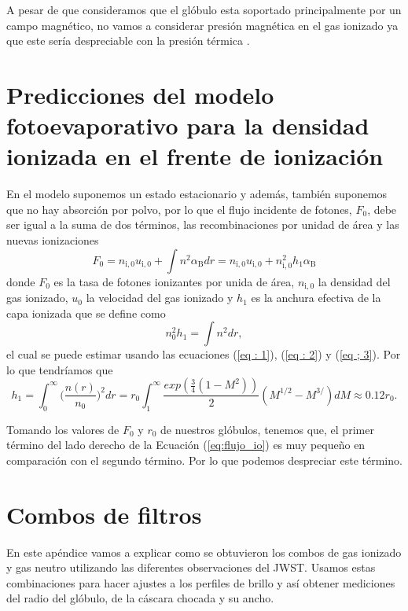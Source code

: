 \documentclass{book}
\begin{document}
A pesar de que consideramos que el glóbulo esta soportado principalmente por un campo magnético, no vamos a considerar presión magnética en el gas ionizado ya que este sería despreciable con la presión térmica \citep{Will:2009}.

\chapter{Predicciones del modelo fotoevaporativo para la densidad ionizada en el frente de ionización }\label{App : tasa de fotoionizacion}

En el modelo suponemos un estado estacionario y además, también suponemos que no hay absorción por polvo, por lo que el flujo incidente de fotones, $F_0$, debe ser igual a la suma de dos términos, las recombinaciones por unidad de área y las nuevas ionizaciones
\begin{equation}\label{eq:flujo_io}
F_0 = n_\mathrm{i,0} u_\mathrm{i,0} +\int n^2\alpha_\mathrm{B}dr = n_\mathrm{i,0}u_\mathrm{i,0}+n_\mathrm{i,0}^2h_1\alpha_\mathrm{B}
\end{equation}
donde $F_0$ es la tasa de fotones ionizantes por unida de área, $n_\mathrm{i,0}$ la densidad del gas ionizado, $u_0$ la velocidad del gas ionizado y $h_1$ es la anchura efectiva de la capa ionizada que se define como
\begin{equation}
n_0^2h_1=\int n^2dr,
\end{equation}
el cual se puede estimar usando las ecuaciones  (\ref{eq : 1}), (\ref{eq : 2}) y (\ref{eq ; 3}). Por lo que tendríamos que 
\begin{equation}
h_1=\int_0^\infty \Big(\frac{n(r)}{n_0}\Big)^2dr=r_0\int_1^\infty\frac{exp(\frac{3}{4}(1-M^2))}{2}(M^{1/2}-M^{3/})dM\approx0.12r_0.\end{equation}

Tomando los valores de $F_0$ y $r_0$ de nuestros glóbulos, tenemos que, el primer término del lado derecho de la Ecuación (\ref{eq:flujo_io}) es muy pequeño en comparación con el segundo término. Por lo que podemos despreciar este término.

\chapter{Combos de filtros}\label{AP: combos}

En este apéndice vamos a explicar como se obtuvieron los combos de gas ionizado y gas neutro utilizando las diferentes observaciones del JWST. Usamos estas combinaciones para hacer ajustes a los perfiles de brillo y así obtener mediciones del radio del glóbulo, de la cáscara chocada y su ancho.
\end{document}
